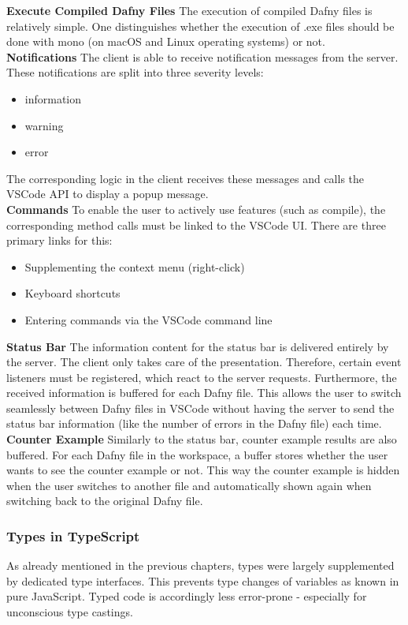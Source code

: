 {\bf Execute Compiled Dafny Files} \textendash{}
The execution of compiled Dafny files is relatively simple.
One distinguishes whether the execution of .exe files should be done with mono (on macOS and Linux operating systems) or not. \\

{\bf Notifications} \textendash{}
The client is able to receive notification messages from the server.
These notifications are split into three severity levels:
\begin{itemize}
    \item information
    \item warning
    \item error
\end{itemize}
The corresponding logic in the client receives these messages and calls the VSCode API to display a popup message. \\

{\bf Commands} \textendash{}
To enable the user to actively use features (such as compile),
the corresponding method calls must be linked to the VSCode UI.
There are three primary links for this:
\begin{itemize}
    \item Supplementing the context menu (right-click)
    \item Keyboard shortcuts
    \item Entering commands via the VSCode command line
\end{itemize}

{\bf Status Bar} \textendash{}
The information content for the status bar is delivered entirely by the server.
The client only takes care of the presentation.
Therefore, certain event listeners must be registered, which react to the server requests.
Furthermore, the received information is buffered for each Dafny file.
This allows the user to switch seamlessly between Dafny files in VSCode
without having the server to send the status bar information
(like the number of errors in the Dafny file) each time.\\

{\bf Counter Example} \textendash{}
Similarly to the status bar, counter example results are also buffered.
For each Dafny file in the workspace, a buffer stores whether the user wants to see the counter example or not.
This way the counter example is hidden when the user switches to another file
and automatically shown again when switching back to the original Dafny file.

\subsubsection{Types in TypeScript}
As already mentioned in the previous chapters,  types were largely supplemented by dedicated type interfaces.
This prevents type changes of variables as known in pure JavaScript.
Typed code is accordingly less error-prone - especially for unconscious type castings. \\

